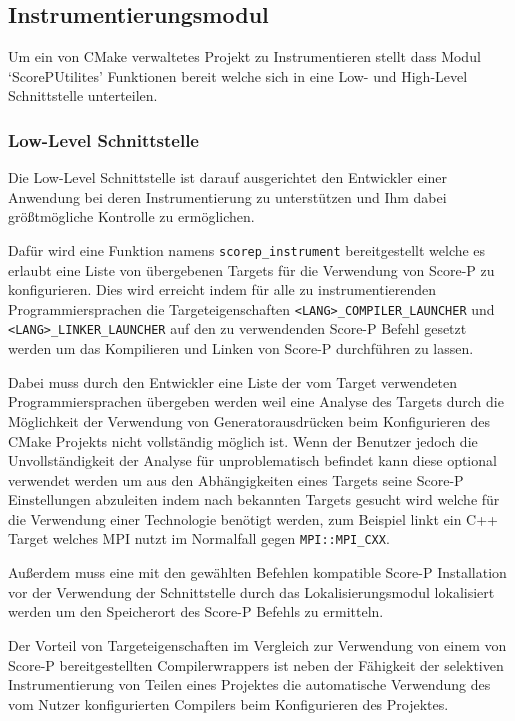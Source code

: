 \documentclass[german,proseminar,hyperref,utf8,lof]{zihpub}
\begin{document}
    \subsection{Instrumentierungsmodul}
    Um ein von CMake verwaltetes Projekt zu Instrumentieren stellt dass Modul `ScorePUtilites'
    Funktionen bereit welche sich in eine Low- und High-Level Schnittstelle unterteilen.

    \subsubsection{Low-Level Schnittstelle}
    Die Low-Level Schnittstelle ist darauf ausgerichtet den Entwickler einer Anwendung bei deren
    Instrumentierung zu unterstützen und Ihm dabei grö{\ss}tmögliche Kontrolle zu ermöglichen.

    Dafür wird eine Funktion namens \texttt{scorep\_instrument} bereitgestellt welche es erlaubt eine Liste
    von übergebenen Targets für die Verwendung von Score-P zu konfigurieren.
    Dies wird erreicht indem für alle zu instrumentierenden Programmiersprachen die Targeteigenschaften
    \texttt{<LANG>\_COMPILER\_LAUNCHER} und \texttt{<LANG>\_LINKER\_LAUNCHER} auf den zu verwendenden
    Score-P Befehl gesetzt werden um das Kompilieren und Linken von Score-P durchführen zu lassen.

    Dabei muss durch den Entwickler eine Liste der vom Target verwendeten Programmiersprachen übergeben
    werden weil eine Analyse des Targets durch die Möglichkeit der Verwendung von Generatorausdrücken 
    beim Konfigurieren des CMake Projekts nicht vollständig möglich ist.
    Wenn der Benutzer jedoch die Unvollständigkeit der Analyse für unproblematisch befindet
    kann diese optional verwendet werden um aus den Abhängigkeiten eines Targets seine Score-P
    Einstellungen abzuleiten indem nach bekannten Targets gesucht wird welche für die Verwendung
    einer Technologie benötigt werden, zum Beispiel linkt ein C++ Target welches MPI nutzt im Normalfall
    gegen \texttt{MPI::MPI\_CXX}.

    Au{\ss}erdem muss eine mit den gewählten Befehlen kompatible Score-P Installation vor der Verwendung
    der Schnittstelle durch das Lokalisierungsmodul lokalisiert werden um den Speicherort des
    Score-P Befehls zu ermitteln.

    Der Vorteil von Targeteigenschaften im Vergleich zur Verwendung von einem von Score-P bereitgestellten
    Compilerwrappers ist neben der Fähigkeit der selektiven Instrumentierung von Teilen eines Projektes
    die automatische Verwendung des vom Nutzer konfigurierten Compilers beim Konfigurieren des Projektes.
\end{document}
